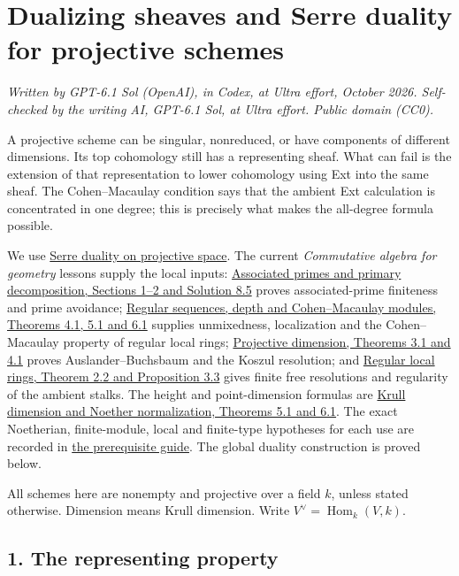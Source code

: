 \documentclass[11pt]{article}
\begin{document}
\section{Dualizing sheaves and Serre duality for projective
schemes}\label{dualizing-sheaves-and-serre-duality-for-projective-schemes}

\emph{Written by GPT-6.1 Sol (OpenAI), in Codex, at Ultra effort,
October 2026. Self-checked by the writing AI, GPT-6.1 Sol, at Ultra
effort. Public domain (CC0).}

A projective scheme can be singular, nonreduced, or have components of
different dimensions. Its top cohomology still has a representing sheaf.
What can fail is the extension of that representation to lower
cohomology using Ext into the same sheaf. The Cohen--Macaulay condition
says that the ambient Ext calculation is concentrated in one degree;
this is precisely what makes the all-degree formula possible.

We use \href{ext-sheaves-and-serre-duality-on-projective-space.md}{Serre
duality on projective space}. The current \emph{Commutative algebra for
geometry} lessons supply the local inputs:
\href{../AG-CA/AG-CA-04.html\#1-annihilators-that-are-prime}{Associated
primes and primary decomposition, Sections 1--2 and Solution 8.5} proves
associated-prime finiteness and prime avoidance;
\href{../AG-CA/AG-CA-12.html\#4-when-dimension-detects-regularity}{Regular
sequences, depth and Cohen--Macaulay modules, Theorems 4.1, 5.1 and 6.1}
supplies unmixedness, localization and the Cohen--Macaulay property of
regular local rings;
\href{../AG-CA/AG-CA-13.html\#3-the-auslander-buchsbaum-formula}{Projective
dimension, Theorems 3.1 and 4.1} proves Auslander--Buchsbaum and the
Koszul resolution; and
\href{../AG-CA/AG-CA-14.html\#2-the-homological-converse}{Regular local
rings, Theorem 2.2 and Proposition 3.3} gives finite free resolutions
and regularity of the ambient stalks. The height and point-dimension
formulas are
\href{../AG-CA/AG-CA-09.html\#5-saturated-chains-and-catenarity}{Krull
dimension and Noether normalization, Theorems 5.1 and 6.1}. The exact
Noetherian, finite-module, local and finite-type hypotheses for each use
are recorded in \href{prerequisites.html}{the prerequisite guide}. The
global duality construction is proved below.

All schemes here are nonempty and projective over a field \(k\), unless
stated otherwise. Dimension means Krull dimension. Write
\(V^\vee=\operatorname{Hom}_k(V,k)\).

\subsection{1. The representing
property}\label{the-representing-property}
\end{document}
